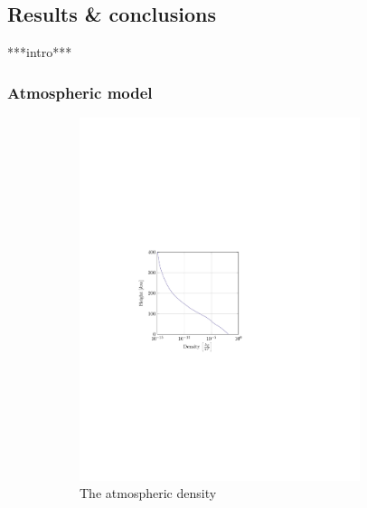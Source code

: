 \subsection{Results \& conclusions}
\label{sec:astrores}
***intro***\\

\subsubsection{Atmospheric model}
\label{sec:astroatmos}
\begin{figure}[h]
	\centering
	\begin{subfigure}{0.45\textwidth}
	\centering
	\includegraphics[trim={4cm 9.8cm 9cm 10cm},clip,width=0.9\textwidth]{Figure/atmos_model/density.pdf}
	\caption{The atmospheric density} 
	\label{fig:atmos_height_rho}
	\end{subfigure}
	\begin{subfigure}{0.45\textwidth}
	\centering

\end{subfigure}
\end{figure}
